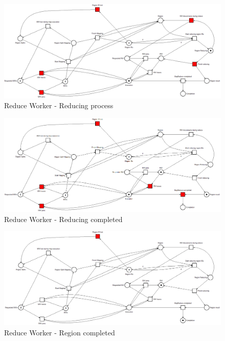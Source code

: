 \begin{figure}[!ht]
    \centering
    \includegraphics[width=\linewidth]{document/chapters/chapter_6/images/master_petri_net_6.png}
    \caption{Reduce Worker - Reducing process}
    \label{fig:master_petri_net_6}
\end{figure}

\begin{figure}[!ht]
    \centering
    \includegraphics[width=\linewidth]{document/chapters/chapter_6/images/master_petri_net_7.png}
    \caption{Reduce Worker - Reducing completed}
    \label{fig:master_petri_net_7}
\end{figure}

\begin{figure}[!ht]
    \centering
    \includegraphics[width=\linewidth]{document/chapters/chapter_6/images/master_petri_net_8.png}
    \caption{Reduce Worker - Region completed}
    \label{fig:master_petri_net_8}
\end{figure}